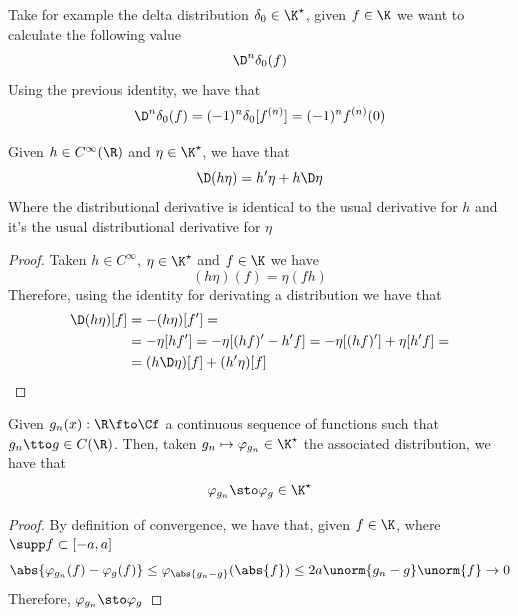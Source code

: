 \documentclass[../mmf.tex]{subfiles}
\begin{document}
\begin{eg}
	Take for example the delta distribution $\delta_0\in\K^\star$, given $f\in\K$ we want to calculate the following value
	\begin{equation*}
		\D^n\delta_0(f)
	\end{equation*}
	Using the previous identity, we have that
	\begin{equation*}
		\D^n\delta_0(f)=(-1)^n\delta_0[f^{(n)}]=(-1)^nf^{(n)}(0)
	\end{equation*}
\end{eg}
\begin{thm}
	Given $h\in C^\infty(\R)$ and $\eta\in\K^\star$, we have that
	\begin{equation*}
		\D(h\eta)=h'\eta+h\D\eta
	\end{equation*}
	Where the distributional derivative is identical to the usual derivative for $h$ and it's the usual distributional derivative for $\eta$
\end{thm}
\begin{proof}
	Taken $h\in C^\infty$, $\eta\in\K^\star$ and $f\in\K$ we have
	\begin{equation*}
		(h\eta)(f)=\eta(fh)
	\end{equation*}
	Therefore, using the identity for derivating a distribution we have that
	\begin{equation*}
		\begin{aligned}
			\D(h\eta)[f]&=-(h\eta)[f']=\\
			&=-\eta[hf']=-\eta[(hf)'-h'f]=-\eta[(hf)']+\eta[h'f]=\\
			&=(h\D\eta)[f]+(h'\eta)[f]
		\end{aligned}
	\end{equation*}
\end{proof}
\begin{thm}
	Given $g_n(x):\R\fto\Cf$ a continuous sequence of functions such that $g_n\tto g\in C(\R)$. Then, taken $g_n\mapsto\varphi_{g_n}\in\K^\star$ the associated distribution, we have that
	\begin{equation*}
		\varphi_{g_n}\sto\varphi_g\in\K^\star
	\end{equation*}
\end{thm}
\begin{proof}
	By definition of convergence, we have that, given $f\in\K$, where $\supp f\subset[-a,a]$
	\begin{equation*}
		\abs{\varphi_{g_n}(f)-\varphi_g(f)}\le\varphi_{\abs{g_n-g}}(\abs{f})\le2a\unorm{g_n-g}\unorm{f}\to0
	\end{equation*}
	Therefore, $\varphi_{g_n}\sto\varphi_g$
\end{proof}
\end{document}
